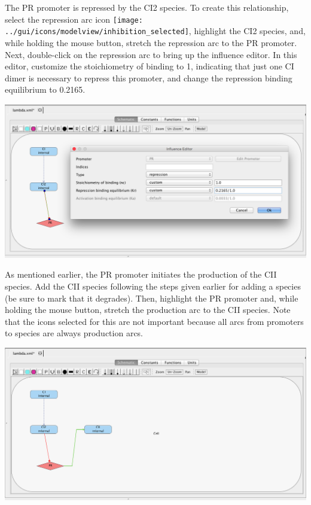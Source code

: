 \documentclass[titlepage,11pt]{article}
\begin{document}
The PR promoter is repressed by the CI2 species.  To create this relationship, select the repression arc icon 
\texttt{[image: ../gui/icons/modelview/inhibition\_selected]}, highlight the CI2 species, and, while holding the mouse button, stretch the repression arc to the PR promoter.  Next, double-click on the repression arc to bring up the influence editor.  In this editor, customize the stoichiometry of binding to 1, indicating that just one CI dimer is necessary to repress this promoter, and change the repression binding equilibrium to 0.2165.

\begin{center}
\includegraphics[width=160mm]{screenshots/repression} 
\end{center}

As mentioned earlier, the PR promoter initiates the production of the CII species.  Add the CII species following the steps given earlier for adding a species (be sure to mark that it degrades).  Then, highlight the PR promoter and, while holding the mouse button, stretch the production arc to the CII species.  Note that the icons selected for this are not important because all arcs from promoters to species are always production arcs.

\begin{center}
\includegraphics[width=160mm]{screenshots/production}
\end{center}
\end{document}
